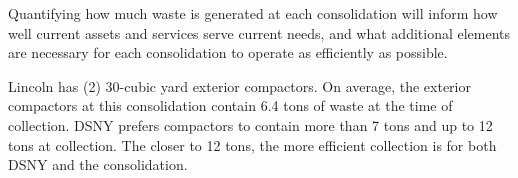 
    Quantifying how much waste is generated at each consolidation will inform how well current assets and services serve current needs, and what additional elements are necessary for each consolidation to operate as efficiently as possible.
    
    Lincoln has (2) 30-cubic yard exterior compactors. On average, the exterior compactors at this consolidation contain 6.4 tons of waste at the time of collection. DSNY prefers compactors to contain more than 7 tons and up to 12 tons at collection. The closer to 12 tons, the more efficient collection is for both DSNY and the consolidation.